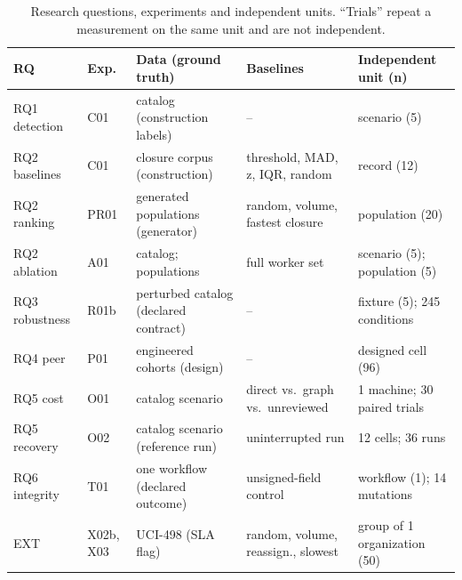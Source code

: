 \begin{table}[!htbp]
\caption{Research questions, experiments and independent units. ``Trials'' repeat a
measurement on the same unit and are not independent.}
\label{tab:design}
\centering
\scriptsize
\setlength{\tabcolsep}{3pt}
\begin{tabular}{@{}L{1.9cm}L{1.2cm}L{2.9cm}L{2.7cm}L{2.6cm}@{}}
\toprule
RQ & Exp. & Data (ground truth) & Baselines & Independent unit (n) \\
\midrule
RQ1 detection & C01 & catalog (construction labels) & -- & scenario (5) \\
RQ2 baselines & C01 & closure corpus (construction) & threshold, MAD, z, IQR, random & record (12) \\
RQ2 ranking & PR01 & generated populations (generator) & random, volume, fastest closure & population (20) \\
RQ2 ablation & A01 & catalog; populations & full worker set & scenario (5); population (5) \\
RQ3 robustness & R01b & perturbed catalog (declared contract) & -- & fixture (5); 245 conditions \\
RQ4 peer & P01 & engineered cohorts (design) & -- & designed cell (96) \\
RQ5 cost & O01 & catalog scenario & direct vs.\ graph vs.\ unreviewed & 1 machine; 30 paired trials \\
RQ5 recovery & O02 & catalog scenario (reference run) & uninterrupted run & 12 cells; 36 runs \\
RQ6 integrity & T01 & one workflow (declared outcome) & unsigned-field control & workflow (1); 14 mutations \\
EXT & X02b, X03 & UCI-498 (SLA flag) & random, volume, reassign., slowest & group of 1 organization (50) \\
\bottomrule
\end{tabular}
\end{table}

